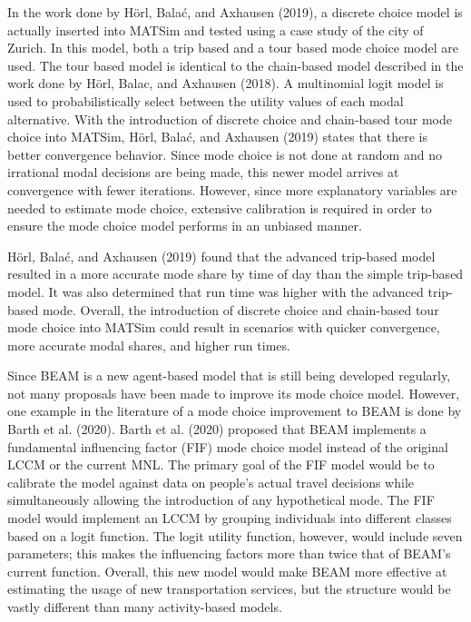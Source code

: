 \documentclass[12pt, oneside, openright]{byuthesis}
\begin{document}
In the work done by Hörl, Balać, and Axhausen (2019), a discrete choice model is actually inserted into MATSim and tested using a case study of the city of Zurich. In this model, both a trip based and a tour based mode choice model are used. The tour based model is identical to the chain-based model described in the work done by Hörl, Balac, and Axhausen (2018). A multinomial logit model is used to probabilistically select between the utility values of each modal alternative. With the introduction of discrete choice and chain-based tour mode choice into MATSim, Hörl, Balać, and Axhausen (2019) states that there is better convergence behavior. Since mode choice is not done at random and no irrational modal decisions are being made, this newer model arrives at convergence with fewer iterations. However, since more explanatory variables are needed to estimate mode choice, extensive calibration is required in order to ensure the mode choice model performs in an unbiased manner.

Hörl, Balać, and Axhausen (2019) found that the advanced trip-based model resulted in a more accurate mode share by time of day than the simple trip-based model. It was also determined that run time was higher with the advanced trip-based mode. Overall, the introduction of discrete choice and chain-based tour mode choice into MATSim could result in scenarios with quicker convergence, more accurate modal shares, and higher run times.

Since BEAM is a new agent-based model that is still being developed regularly, not many proposals have been made to improve its mode choice model. However, one example in the literature of a mode choice improvement to BEAM is done by Barth et al. (2020). Barth et al. (2020) proposed that BEAM implements a fundamental influencing factor (FIF) mode choice model instead of the original LCCM or the current MNL. The primary goal of the FIF model would be to calibrate the model against data on people's actual travel decisions while simultaneously allowing the introduction of any hypothetical mode. The FIF model would implement an LCCM by grouping individuals into different classes based on a logit function. The logit utility function, however, would include seven parameters; this makes the influencing factors more than twice that of BEAM's current function. Overall, this new model would make BEAM more effective at estimating the usage of new transportation services, but the structure would be vastly different than many activity-based models.
\end{document}

